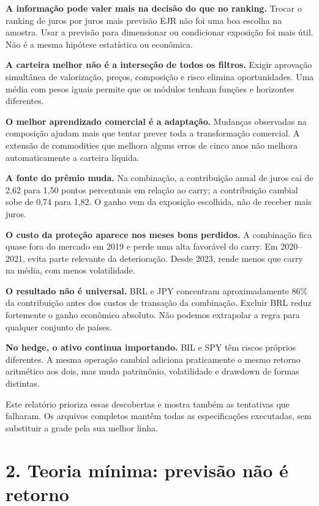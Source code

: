 \documentclass[11pt,a4paper]{article}
\begin{document}
\textbf{A informação pode valer mais na decisão do que no ranking.} Trocar o ranking de juros por juros mais previsão EJR não foi uma boa escolha na amostra. Usar a previsão para dimensionar ou condicionar exposição foi mais útil. Não é a mesma hipótese estatística ou econômica.

\textbf{A carteira melhor não é a interseção de todos os filtros.} Exigir aprovação simultânea de valorização, preços, composição e risco elimina oportunidades. Uma média com pesos iguais permite que os módulos tenham funções e horizontes diferentes.

\textbf{O melhor aprendizado comercial é a adaptação.} Mudanças observadas na composição ajudam mais que tentar prever toda a transformação comercial. A extensão de commodities que melhora alguns erros de cinco anos não melhora automaticamente a carteira líquida.

\textbf{A fonte do prêmio muda.} Na combinação, a contribuição anual de juros cai de 2,62 para 1,50 pontos percentuais em relação ao carry; a contribuição cambial sobe de 0,74 para 1,82. O ganho vem da exposição escolhida, não de receber mais juros.

\textbf{O custo da proteção aparece nos meses bons perdidos.} A combinação fica quase fora do mercado em 2019 e perde uma alta favorável do carry. Em 2020--2021, evita parte relevante da deterioração. Desde 2023, rende menos que carry na média, com menos volatilidade.

\textbf{O resultado não é universal.} BRL e JPY concentram aproximadamente 86\% da contribuição antes dos custos de transação da combinação. Excluir BRL reduz fortemente o ganho econômico absoluto. Não podemos extrapolar a regra para qualquer conjunto de países.

\textbf{No hedge, o ativo continua importando.} BIL e SPY têm riscos próprios diferentes. A mesma operação cambial adiciona praticamente o mesmo retorno aritmético aos dois, mas muda patrimônio, volatilidade e drawdown de formas distintas.

Este relatório prioriza essas descobertas e mostra também as tentativas que falharam. Os arquivos completos mantêm todas as especificações executadas, sem substituir a grade pela sua melhor linha.

\clearpage
\section*{2. Teoria mínima: previsão não é retorno}
\end{document}
